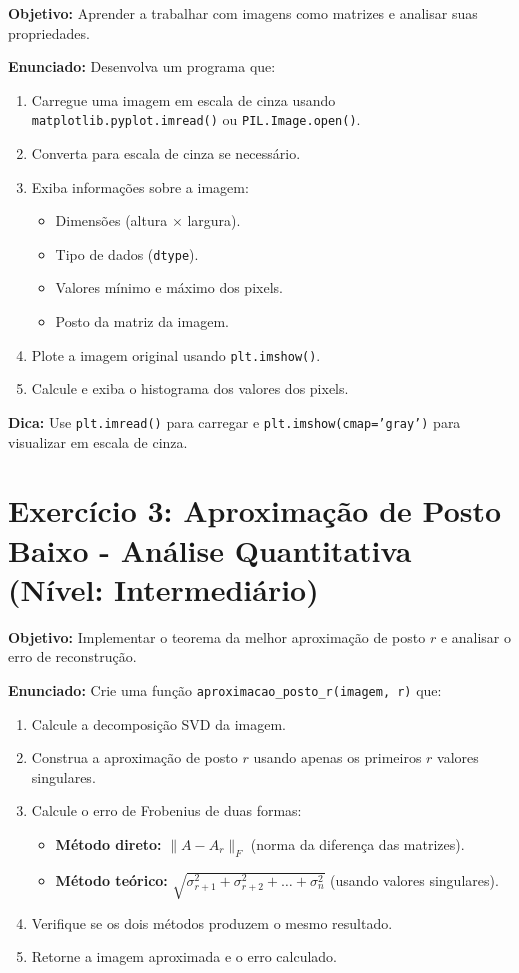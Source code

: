 \documentclass[a4paper,12pt]{article}
\begin{document}
\textbf{Objetivo:} Aprender a trabalhar com imagens como matrizes e analisar suas propriedades.

\textbf{Enunciado:}
Desenvolva um programa que:
\begin{enumerate}
    \item Carregue uma imagem em escala de cinza usando \texttt{matplotlib.pyplot.imread()} ou \texttt{PIL.Image.open()}.
    \item Converta para escala de cinza se necessário.
    \item Exiba informações sobre a imagem:
    \begin{itemize}
        \item Dimensões (altura $\times$ largura).
        \item Tipo de dados (\texttt{dtype}).
        \item Valores mínimo e máximo dos pixels.
        \item Posto da matriz da imagem.
    \end{itemize}
    \item Plote a imagem original usando \texttt{plt.imshow()}.
    \item Calcule e exiba o histograma dos valores dos pixels.
\end{enumerate}

\textbf{Dica:} Use \texttt{plt.imread()} para carregar e \texttt{plt.imshow(cmap='gray')} para visualizar em escala de cinza.

\section*{Exercício 3: Aproximação de Posto Baixo - Análise Quantitativa (Nível: Intermediário)}

\textbf{Objetivo:} Implementar o teorema da melhor aproximação de posto $r$ e analisar o erro de reconstrução.

\textbf{Enunciado:}
Crie uma função \texttt{aproximacao\_posto\_r(imagem, r)} que:
\begin{enumerate}
    \item Calcule a decomposição SVD da imagem.
    \item Construa a aproximação de posto $r$ usando apenas os primeiros $r$ valores singulares.
    \item Calcule o erro de Frobenius de duas formas:
    \begin{itemize}
        \item \textbf{Método direto:} $\|A - A_r\|_F$ (norma da diferença das matrizes).
        \item \textbf{Método teórico:} $\sqrt{\sigma_{r+1}^2 + \sigma_{r+2}^2 + \dots + \sigma_n^2}$ (usando valores singulares).
    \end{itemize}
    \item Verifique se os dois métodos produzem o mesmo resultado.
    \item Retorne a imagem aproximada e o erro calculado.
\end{enumerate}
\end{document}
